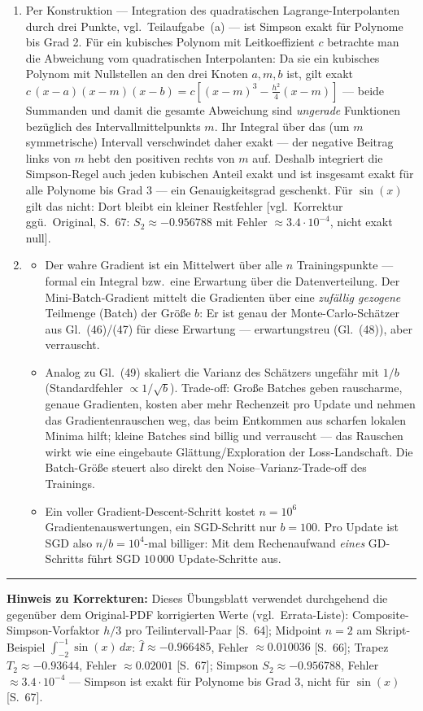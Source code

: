 \documentclass[a4paper,11pt]{scrartcl}
\newcounter{aufgabe}
\begin{document}
\begin{enumerate}[label=(\alph*)]
  Die Simpson-Regel liefert also den exakten Wert $\frac{1}{4}$ --- Fehler null.
  \item Per Konstruktion --- Integration des quadratischen Lagrange-Interpolanten durch drei Punkte, vgl.\ Teilaufgabe~(a) --- ist Simpson exakt für Polynome bis Grad 2. Für ein kubisches Polynom mit Leitkoeffizient $c$ betrachte man die Abweichung vom quadratischen Interpolanten: Da sie ein kubisches Polynom mit Nullstellen an den drei Knoten $a, m, b$ ist, gilt exakt $c\,(x-a)(x-m)(x-b) = c\left[(x-m)^3 - \tfrac{h^2}{4}(x-m)\right]$ --- beide Summanden und damit die gesamte Abweichung sind \emph{ungerade} Funktionen bezüglich des Intervallmittelpunkts $m$. Ihr Integral über das (um $m$ symmetrische) Intervall verschwindet daher exakt --- der negative Beitrag links von $m$ hebt den positiven rechts von $m$ auf. Deshalb integriert die Simpson-Regel auch jeden kubischen Anteil exakt und ist insgesamt exakt für alle Polynome bis Grad 3 --- ein \glqq Genauigkeitsgrad geschenkt\grqq. Für $\sin(x)$ gilt das nicht: Dort bleibt ein kleiner Restfehler [vgl.\ Korrektur ggü.\ Original, S.~67: $S_2 \approx -0.956788$ mit Fehler $\approx 3.4 \cdot 10^{-4}$, nicht exakt null].
  \item
  \begin{itemize}[nosep]
    \item[(i)] Der wahre Gradient ist ein Mittelwert über alle $n$ Trainingspunkte --- formal ein Integral bzw.\ eine Erwartung über die Datenverteilung. Der Mini-Batch-Gradient mittelt die Gradienten über eine \emph{zufällig gezogene} Teilmenge (Batch) der Größe $b$: Er ist genau der Monte-Carlo-Schätzer aus Gl.~(46)/(47) für diese Erwartung --- erwartungstreu (Gl.~(48)), aber verrauscht.
    \item[(ii)] Analog zu Gl.~(49) skaliert die Varianz des Schätzers ungefähr mit $1/b$ (Standardfehler $\propto 1/\sqrt{b}$). Trade-off: Große Batches geben rauscharme, genaue Gradienten, kosten aber mehr Rechenzeit pro Update und nehmen das Gradientenrauschen weg, das beim Entkommen aus scharfen lokalen Minima hilft; kleine Batches sind billig und verrauscht --- das Rauschen wirkt wie eine eingebaute Glättung/Exploration der Loss-Landschaft. Die Batch-Größe steuert also direkt den Noise--Varianz-Trade-off des Trainings.
    \item[(iii)] Ein voller Gradient-Descent-Schritt kostet $n = 10^6$ Gradientenauswertungen, ein SGD-Schritt nur $b = 100$. Pro Update ist SGD also $n/b = 10^4$-mal billiger: Mit dem Rechenaufwand \emph{eines} GD-Schritts führt SGD $10\,000$ Update-Schritte aus.
  \end{itemize}
\end{enumerate}

\bigskip
\hrule
\medskip
\noindent\small\textbf{Hinweis zu Korrekturen:} Dieses Übungsblatt verwendet durchgehend die gegenüber dem Original-PDF korrigierten Werte (vgl.\ Errata-Liste): Composite-Simpson-Vorfaktor $h/3$ pro Teilintervall-Paar [S.~64]; Midpoint $n{=}2$ am Skript-Beispiel $\int_{-2}^{-1}\sin(x)\,dx$: $\hat{I} \approx -0.966485$, Fehler $\approx 0.010036$ [S.~66]; Trapez $T_2 \approx -0.93644$, Fehler $\approx 0.02001$ [S.~67]; Simpson $S_2 \approx -0.956788$, Fehler $\approx 3.4 \cdot 10^{-4}$ --- Simpson ist exakt für Polynome bis Grad 3, nicht für $\sin(x)$ [S.~67].
\end{document}

